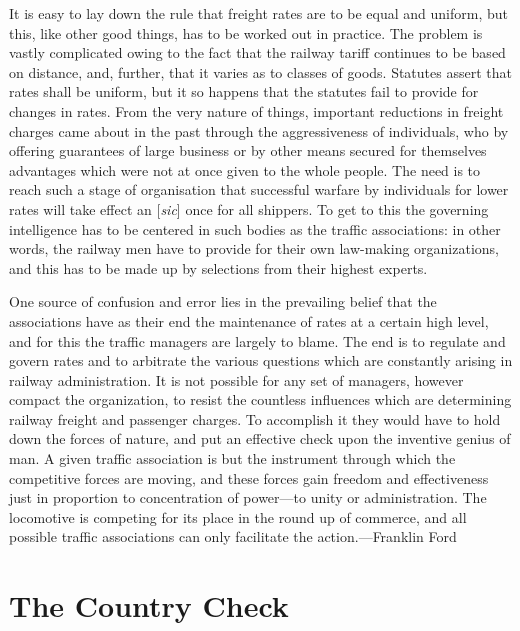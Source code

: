 \documentclass[openany,nobib]{tufte-book}
\let\oldchapter\chapter
\def\chapter{%
  \setcounter{footnote}{0}%
  \oldchapter
}
\begin{document}
It is easy to lay down the rule that freight rates are to be equal and
uniform, but this, like other good things, has to be worked out in
practice. The problem is vastly complicated owing to the fact that the
railway tariff continues to be based on distance, and, further, that it
varies as to classes of goods. Statutes assert that rates shall be
uniform, but it so happens that the statutes fail to provide for changes
in rates. From the very nature of things, important reductions in
freight charges came about in the past through the aggressiveness of
individuals, who by offering guarantees of large business or by other
means secured for themselves advantages which were not at once given to
the whole people. The need is to reach such a stage of organisation that
successful warfare by individuals for lower rates will take effect an
{[}\emph{sic}{]} once for all shippers. To get to this the governing
intelligence has to be centered in such bodies as the traffic
associations: in other words, the railway men have to provide for their
own law-making organizations, and this has to be made up by selections
from their highest experts.

One source of confusion and error lies in the prevailing belief that the
associations have as their end the maintenance of rates at a certain
high level, and for this the traffic managers are largely to blame. The
end is to regulate and govern rates and to arbitrate the various
questions which are constantly arising in railway administration. It is
not possible for any set of managers, however compact the organization,
to resist the countless influences which are determining railway freight
and passenger charges. To accomplish it they would have to hold down the
forces of nature, and put an effective check upon the inventive genius
of man. A given traffic association is but the instrument through which
the competitive forces are moving, and these forces gain freedom and
effectiveness just in proportion to concentration of power---to unity or
administration. The locomotive is competing for its place in the round
up of commerce, and all possible traffic associations can only
facilitate the action.---Franklin Ford

\chapter[The Country Check]{The Country Check}
\label{ch:The Country Check}

\vspace{.2in}
\end{document}
